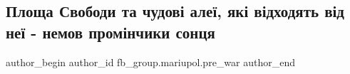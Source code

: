  
 
 
 
 

\subsection{Площа Свободи та чудові алеї,  які відходять від неї - немов промінчики сонця}
\label{sec:11_02_2023.fb.fb_group.mariupol.pre_war.8.ploshcha_svobodi_ta_}

\ifcmt
 author_begin
   author_id fb_group.mariupol.pre_war
 author_end
\fi
